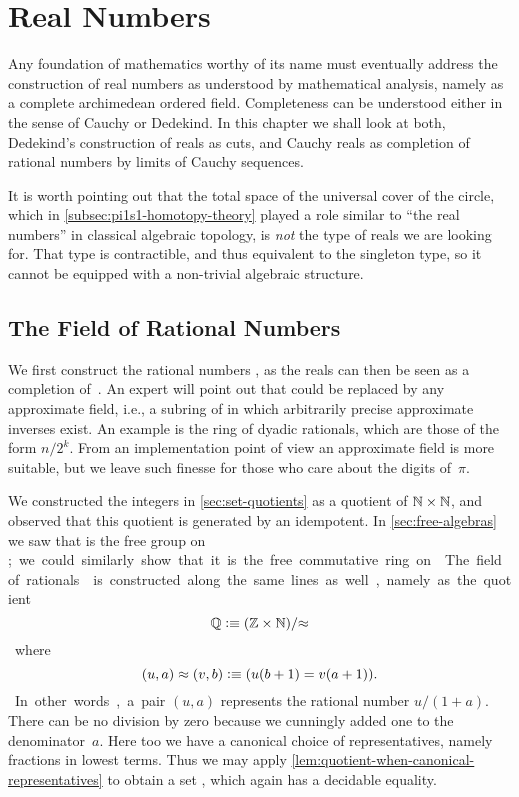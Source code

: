 \newcommand{\rclim}{\mathsf{lim}} %
\newcommand{\rcrat}{\mathsf{rat}} %
\newcommand{\rceq}{\mathsf{eq}_{\RC}} %
\newcommand{\CAP}{\mathcal{C}}    %
\newcommand{\Qp}{\Q_{+}}
\newcommand{\apart}{\mathrel{\#}}  %
\newcommand{\dcut}{\mathsf{isCut}}  %


\chapter{Real Numbers}
\label{cha:real-numbers}

Any foundation of mathematics worthy of its name must eventually address the construction
of real numbers as understood by mathematical analysis, namely as a complete archimedean
ordered field. Completeness can be understood either in the sense of Cauchy or Dedekind.
In this chapter we shall look at both, Dedekind's construction of reals as cuts, and
Cauchy reals as completion of rational numbers by limits of Cauchy sequences.

It is worth pointing out that the total space of the universal cover of the circle, which
in \autoref{subsec:pi1s1-homotopy-theory} played a role similar to ``the real numbers'' in
classical algebraic topology, is \emph{not} the type of reals we are looking for. That
type is contractible, and thus equivalent to the singleton type, so it cannot be equipped
with a non-trivial algebraic structure.


\section{The Field of Rational Numbers}
\label{sec:field-rati-numb}

We first construct the rational numbers \Q, as the reals can then be seen as a completion
of~\Q. An expert will point out that \Q could be replaced by any approximate field, i.e.,
a subring of \Q in which arbitrarily precise approximate inverses exist. An example is the
ring of dyadic rationals, which are those of the form $n/2^k$. From an implementation
point of view an approximate field is more suitable, but we leave such finesse for those
who care about the digits of~$\pi$.

We constructed the integers \Z in \autoref{sec:set-quotients} as a quotient of $\mathbb{N}\times
\mathbb{N}$, and observed that this quotient is generated by an idempotent. In
\autoref{sec:free-algebras} we saw that \Z is the free group on \unit; we could similarly
show that it is the free commutative ring on \emptyt. The field of rationals \Q is
constructed along the same lines as well, namely as the quotient
%
\[ \mathbb{Q} \vcentcolon\equiv (\mathbb{Z} \times \mathbb{N})/{\approx} \]
%
where
\[ (u,a) \approx (v,b) \vcentcolon\equiv (u (b + 1) = v (a + 1)). \]
%
In other words, a pair $(u, a)$ represents the rational number $u / (1 + a)$. There can be
no division by zero because we cunningly added one to the denominator~$a$. Here too we
have a canonical choice of representatives, namely fractions in lowest terms. Thus we may
apply \autoref{lem:quotient-when-canonical-representatives} to obtain a set \Q, which
again has a decidable equality.

